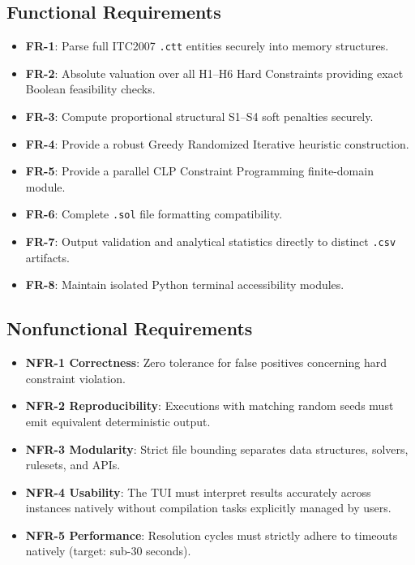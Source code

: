\documentclass[11pt,letterpaper]{article}
\begin{document}
\subsection{Functional Requirements}
\begin{itemize}[nosep]
  \item \textbf{FR-1}: Parse full ITC2007 \texttt{.ctt} entities securely into memory structures.
  \item \textbf{FR-2}: Absolute valuation over all H1--H6 Hard Constraints providing exact Boolean feasibility checks.
  \item \textbf{FR-3}: Compute proportional structural S1--S4 soft penalties securely.
  \item \textbf{FR-4}: Provide a robust Greedy Randomized Iterative heuristic construction.
  \item \textbf{FR-5}: Provide a parallel CLP Constraint Programming finite-domain module.
  \item \textbf{FR-6}: Complete \texttt{.sol} file formatting compatibility.
  \item \textbf{FR-7}: Output validation and analytical statistics directly to distinct \texttt{.csv} artifacts.
  \item \textbf{FR-8}: Maintain isolated Python terminal accessibility modules.
\end{itemize}

\subsection{Nonfunctional Requirements}
\begin{itemize}[nosep]
  \item \textbf{NFR-1 Correctness}: Zero tolerance for false positives concerning hard constraint violation.
  \item \textbf{NFR-2 Reproducibility}: Executions with matching random seeds must emit equivalent deterministic output.
  \item \textbf{NFR-3 Modularity}: Strict file bounding separates data structures, solvers, rulesets, and APIs.
  \item \textbf{NFR-4 Usability}: The TUI must interpret results accurately across instances natively without compilation tasks explicitly managed by users.
  \item \textbf{NFR-5 Performance}: Resolution cycles must strictly adhere to timeouts natively (target: sub-30 seconds).
\end{itemize}
\end{document}
